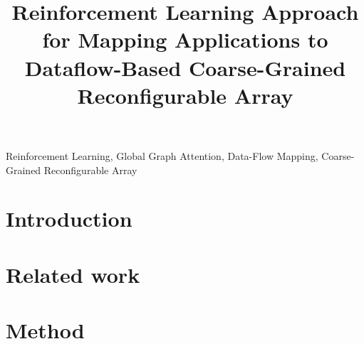 \documentclass[lettersize,journal]{IEEEtran}
\begin{document}
\title{Reinforcement Learning Approach for Mapping Applications to Dataflow-Based Coarse-Grained Reconfigurable Array}




\maketitle

\setlength\abovecaptionskip{-0.5ex}
\setlength\floatsep{-0.1ex}
\begin{abstract}
  
\end{abstract}

\begin{IEEEkeywords}
  Reinforcement Learning, Global Graph Attention, Data-Flow Mapping, Coarse-Grained Reconfigurable Array
\end{IEEEkeywords}

\section{Introduction}
\label{sec:intro}


\section{Related work}
\label{sec:relatedwork}


% 

\section{Method}
\label{sec:rlmapper}

\end{document}

